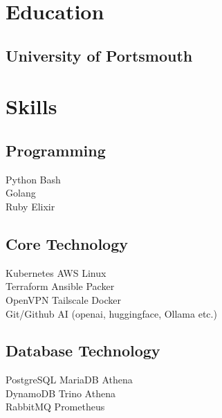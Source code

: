 \documentclass[]{danpilch-resume}
\begin{document}
\hfill
\begin{minipage}[t]{0.33\textwidth}


\section{Education}

\subsection{University of Portsmouth}
\sectionsep


\section{Skills}
\subsection{Programming}
Python \textbullet{} Bash \\
Golang \\
Ruby \textbullet{} Elixir \\
\sectionsep

\subsection{Core Technology}
Kubernetes \textbullet{} AWS \textbullet{} Linux \\
Terraform \textbullet{} Ansible \textbullet{} Packer \\
OpenVPN \textbullet{} Tailscale \textbullet{} Docker \\
Git/Github \textbullet{} AI (openai, huggingface, Ollama etc.) \\
\sectionsep

\subsection{Database Technology}
PostgreSQL \textbullet{} MariaDB \textbullet{} Athena \\
DynamoDB \textbullet{} Trino \textbullet{} Athena \\ 
RabbitMQ \textbullet{} Prometheus \\
\sectionsep


\end{minipage}
\end{document}
